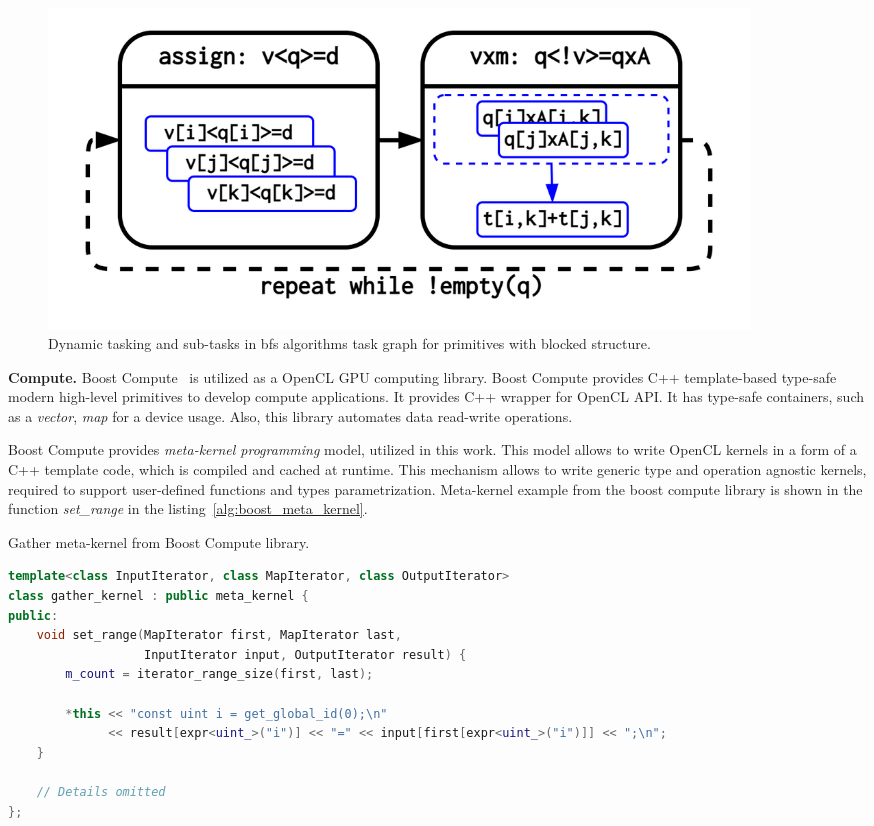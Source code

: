 \begin{figure}
    \centering
    \includegraphics[width=0.9\textwidth]{images/dynamic_tasking_flow.png}
    \caption{Dynamic tasking and sub-tasks in bfs algorithms task graph for primitives with blocked structure.}
    \label{fig:dyn_task_flow}
\end{figure}

\textbf{Compute.} Boost Compute~\cite{article:boost_compute} is utilized as a OpenCL GPU computing library. Boost Compute provides C++ template-based type-safe modern high-level primitives to develop compute applications. It provides C++ wrapper for OpenCL API. It has type-safe containers, such as a \textit{vector}, \textit{map} for a device usage. Also, this library automates data read-write operations. 

Boost Compute provides \textit{meta-kernel programming} model, utilized in this work. This model allows to write OpenCL kernels in a form of a C++ template code, which is compiled and cached at runtime. This mechanism allows to write generic type and operation agnostic kernels, required to support user-defined functions and types parametrization. Meta-kernel example from the boost compute library is shown in the function \textit{set\_range} in the listing~\ref{alg:boost_meta_kernel}.

\lstset{style=codelistingstyle}

\begin{algorithm}[]
\caption{Gather meta-kernel from Boost Compute library.}
\label{alg:boost_meta_kernel}
\begin{lstlisting}[language=C++]
template<class InputIterator, class MapIterator, class OutputIterator>
class gather_kernel : public meta_kernel {
public:
    void set_range(MapIterator first, MapIterator last, 
                   InputIterator input, OutputIterator result) {
        m_count = iterator_range_size(first, last);

        *this << "const uint i = get_global_id(0);\n" 
              << result[expr<uint_>("i")] << "=" << input[first[expr<uint_>("i")]] << ";\n";
    }

    // Details omitted 
};
\end{lstlisting}
\end{algorithm}


